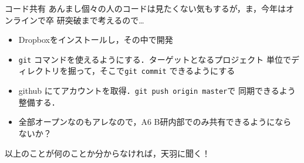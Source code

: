 \documentclass[unicode,12pt,aspectratio=169]{beamer}
\begin{document}
\begin{frame}{コード共有}
あんまし個々の人のコードは見たくない気もするが，ま，今年はオンラインで卒
研突破まで考えるので…
\begin{itemize}
\item Dropboxをインストールし，その中で開発
\item \texttt{git} コマンドを使えるようにする．ターゲットとなるプロジェクト
単位でディレクトリを掘って，そこで\texttt{git commit} できるようにする
\item github にてアカウントを取得．\texttt{git push origin master}で
同期できるよう整備する．
\item 全部オープンなのもアレなので，A6 B研内部でのみ共有できるようになら
ないか？
\end{itemize}
以上のことが何のことか分からなければ，天羽に聞く！
\end{frame}
\end{document}
